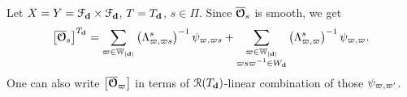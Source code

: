 \begin{eg}
Let $X=Y=\mathcal{F}_{\mathbf{d}} \times \mathcal{F}_{\mathbf{d}}$, $T=T_{\mathbf{d}}$, $s \in \Pi$. Since $\overline{\boldsymbol{\mathcal{O}}}_s$ is smooth, we get
$$\left[  \overline{\boldsymbol{\mathcal{O}}}_s \right]^{T_{\mathbf{d}}}= \sum_{\varpi \in \mathbb{W}_{|\mathbf{d}|}} \left( \Lambda_{\varpi,\varpi s}^{s} \right)^{-1} \psi_{\varpi,\varpi s} +  \sum_{\substack{\varpi \in \mathbb{W}_{|\mathbf{d}|} \\ \varpi s \varpi^{-1} \in W_{\mathbf{d}}}} \left( \Lambda_{\varpi,\varpi}^{s} \right)^{-1} \psi_{\varpi,\varpi}.$$
One can also write $\left[  \overline{\boldsymbol{\mathcal{O}}}_{\varpi} \right]$ in terms of $\operatorname{\operatorname{\mathcal{R}}}(T_{\mathbf{d}})$-linear combination of those $\psi_{\varpi,\varpi'}$.

\end{eg}

